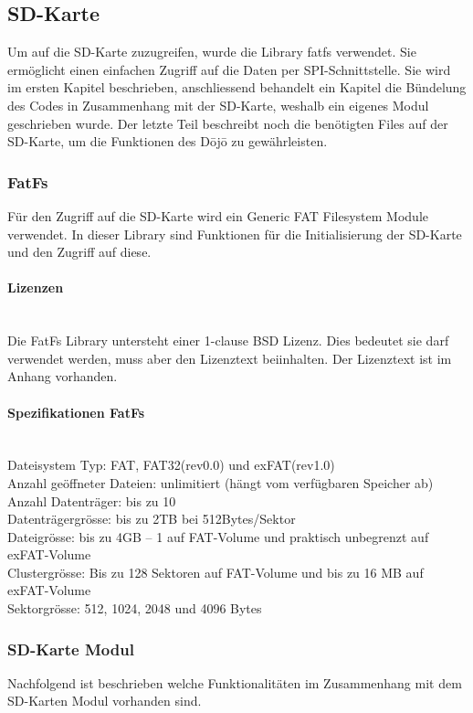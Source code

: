 \subsection{SD-Karte}\label{sec:sdKarte}
Um auf die SD-Karte zuzugreifen, wurde die Library fatfs verwendet. Sie ermöglicht einen einfachen Zugriff auf die Daten per SPI-Schnittstelle. Sie wird im ersten Kapitel beschrieben, anschliessend behandelt ein Kapitel die Bündelung des Codes in Zusammenhang mit der SD-Karte, weshalb ein eigenes Modul geschrieben wurde. Der letzte Teil beschreibt noch die benötigten Files auf der SD-Karte, um die Funktionen des Dōjō zu gewährleisten.

\subsubsection{FatFs}
Für den Zugriff auf die SD-Karte wird ein Generic FAT Filesystem Module verwendet. In dieser Library sind Funktionen für die Initialisierung der SD-Karte und den Zugriff auf diese.

\paragraph{Lizenzen}$~~$\\
Die FatFs Library untersteht einer 1-clause BSD Lizenz. Dies bedeutet sie darf verwendet werden, muss aber den Lizenztext beiinhalten. Der Lizenztext ist im Anhang vorhanden.

\paragraph{Spezifikationen FatFs}$~~$\\
Dateisystem Typ: FAT, FAT32(rev0.0) und exFAT(rev1.0)\\
Anzahl geöffneter Dateien: unlimitiert (hängt vom verfügbaren Speicher ab)\\
Anzahl Datenträger: bis zu 10\\
Datenträgergrösse: bis zu 2TB bei 512Bytes/Sektor\\
Dateigrösse: bis zu 4GB – 1 auf FAT-Volume und praktisch unbegrenzt auf exFAT-Volume\\
Clustergrösse: Bis zu 128 Sektoren auf FAT-Volume und bis zu 16 MB auf exFAT-Volume	\\
Sektorgrösse:  512, 1024, 2048 und 4096 Bytes \cite{FatFs}\\ 

\subsubsection{SD-Karte Modul}
Nachfolgend ist beschrieben welche Funktionalitäten im Zusammenhang mit dem SD-Karten Modul vorhanden sind.

